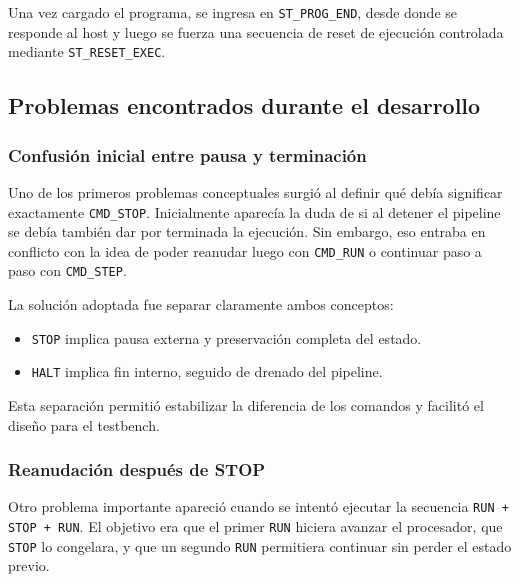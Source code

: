 Una vez cargado el programa, se ingresa en \texttt{ST\_PROG\_END}, desde donde se responde al host y luego se fuerza una secuencia de reset de ejecución controlada mediante \texttt{ST\_RESET\_EXEC}.















\subsection{Problemas encontrados durante el desarrollo}

\subsubsection{Confusión inicial entre pausa y terminación}

Uno de los primeros problemas conceptuales surgió al definir qué debía significar exactamente \texttt{CMD\_STOP}. Inicialmente aparecía la duda de si al detener el pipeline se debía también dar por terminada la ejecución. Sin embargo, eso entraba en conflicto con la idea de poder reanudar luego con \texttt{CMD\_RUN} o continuar paso a paso con \texttt{CMD\_STEP}.

La solución adoptada fue separar claramente ambos conceptos:

\begin{itemize}
    \item \texttt{STOP} implica pausa externa y preservación completa del estado.
    \item \texttt{HALT} implica fin interno, seguido de drenado del pipeline.
\end{itemize}

Esta separación permitió estabilizar la diferencia de los comandos y facilitó el diseño para el testbench.

\subsubsection{Reanudación después de STOP}

Otro problema importante apareció cuando se intentó ejecutar la secuencia \texttt{RUN + STOP + RUN}. El objetivo era que el primer \texttt{RUN} hiciera avanzar el procesador, que \texttt{STOP} lo congelara, y que un segundo \texttt{RUN} permitiera continuar sin perder el estado previo.

